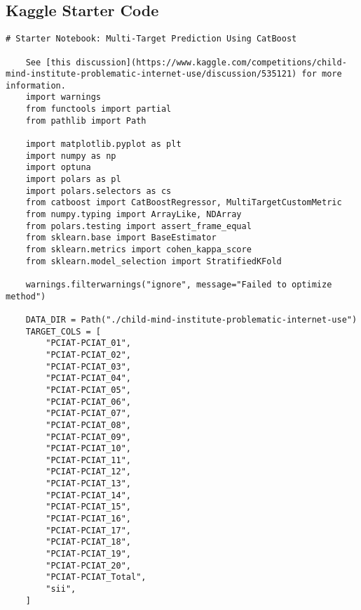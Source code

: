 \begin{appendices}
    \pagebreak
    \section{Kaggle Starter Code \cite{antonina_dolgorukova_2024}}
    \begin{mdframed}
    \begin{lstlisting}[breaklines=true]
    # Starter Notebook: Multi-Target Prediction Using CatBoost

    See [this discussion](https://www.kaggle.com/competitions/child-mind-institute-problematic-internet-use/discussion/535121) for more information.
    import warnings
    from functools import partial
    from pathlib import Path

    import matplotlib.pyplot as plt
    import numpy as np
    import optuna
    import polars as pl
    import polars.selectors as cs
    from catboost import CatBoostRegressor, MultiTargetCustomMetric
    from numpy.typing import ArrayLike, NDArray
    from polars.testing import assert_frame_equal
    from sklearn.base import BaseEstimator
    from sklearn.metrics import cohen_kappa_score
    from sklearn.model_selection import StratifiedKFold

    warnings.filterwarnings("ignore", message="Failed to optimize method")

    DATA_DIR = Path("./child-mind-institute-problematic-internet-use")
    TARGET_COLS = [
        "PCIAT-PCIAT_01",
        "PCIAT-PCIAT_02",
        "PCIAT-PCIAT_03",
        "PCIAT-PCIAT_04",
        "PCIAT-PCIAT_05",
        "PCIAT-PCIAT_06",
        "PCIAT-PCIAT_07",
        "PCIAT-PCIAT_08",
        "PCIAT-PCIAT_09",
        "PCIAT-PCIAT_10",
        "PCIAT-PCIAT_11",
        "PCIAT-PCIAT_12",
        "PCIAT-PCIAT_13",
        "PCIAT-PCIAT_14",
        "PCIAT-PCIAT_15",
        "PCIAT-PCIAT_16",
        "PCIAT-PCIAT_17",
        "PCIAT-PCIAT_18",
        "PCIAT-PCIAT_19",
        "PCIAT-PCIAT_20",
        "PCIAT-PCIAT_Total",
        "sii",
    ]


\end{lstlisting}
\end{mdframed}
\end{appendices}
